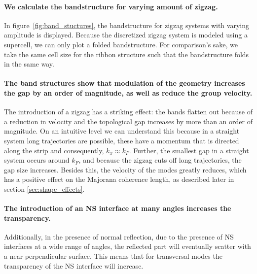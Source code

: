 \documentclass[english, twocolumn, 10pt, aps, superscriptaddress, floatfix, prb, citeautoscript]{revtex4-1}
\renewcommand{\comment}[2]{#2}
\renewcommand{\comment}{\paragraph}
\begin{document}
\comment{We calculate the bandstructure for varying amount of zigzag.}
In figure~\ref{fig:band_stuctures}, the bandstructure for zigzag systems with varying amplitude is displayed.
Because the discretized zigzag system is modeled using a supercell, we can only plot a folded bandstructure.
For comparison's sake, we take the same cell size for the ribbon structure such that the bandstructure folds in the same way.

\comment{The band structures show that modulation of the geometry increases the gap by an order of magnitude, as well as reduce the group velocity.}
The introduction of a zigzag has a striking effect: the bands flatten out because of a reduction in velocity and the topological gap increases by more than an order of magnitude.
On an intuitive level we can understand this because in a straight system long trajectories are possible, these have a momentum that is directed along the strip and consequently, $k_x \approx k_F$.
Further, the smallest gap in a straight system occurs around $k_F$, and because the zigzag cuts off long trajectories, the gap size increases.
Besides this, the velocity of the modes greatly reduces, which has a positive effect on the Majorana coherence length, as described later in section \ref{sec:shape_effects}.

\comment{The introduction of an NS interface at many angles increases the transparency.}
Additionally, in the presence of normal reflection, due to the presence of NS interfaces at a wide range of angles, the reflected part will eventually scatter with a near perpendicular surface.
This means that for transversal modes the transparency of the NS interface will increase.



\end{document}
